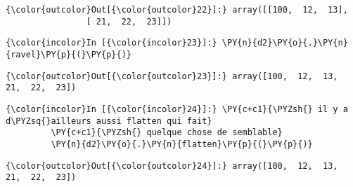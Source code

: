 \begin{Verbatim}[commandchars=\\\{\},frame=single,framerule=0.3mm,rulecolor=\color{cellframecolor}]
{\color{outcolor}Out[{\color{outcolor}22}]:} array([[100,  12,  13],
                [ 21,  22,  23]])
\end{Verbatim}
            
    \begin{Verbatim}[commandchars=\\\{\},frame=single,framerule=0.3mm,rulecolor=\color{cellframecolor}]
{\color{incolor}In [{\color{incolor}23}]:} \PY{n}{d2}\PY{o}{.}\PY{n}{ravel}\PY{p}{(}\PY{p}{)}
\end{Verbatim}


\begin{Verbatim}[commandchars=\\\{\},frame=single,framerule=0.3mm,rulecolor=\color{cellframecolor}]
{\color{outcolor}Out[{\color{outcolor}23}]:} array([100,  12,  13,  21,  22,  23])
\end{Verbatim}
            
    \begin{Verbatim}[commandchars=\\\{\},frame=single,framerule=0.3mm,rulecolor=\color{cellframecolor}]
{\color{incolor}In [{\color{incolor}24}]:} \PY{c+c1}{\PYZsh{} il y a d\PYZsq{}ailleurs aussi flatten qui fait}
         \PY{c+c1}{\PYZsh{} quelque chose de semblable}
         \PY{n}{d2}\PY{o}{.}\PY{n}{flatten}\PY{p}{(}\PY{p}{)}
\end{Verbatim}


\begin{Verbatim}[commandchars=\\\{\},frame=single,framerule=0.3mm,rulecolor=\color{cellframecolor}]
{\color{outcolor}Out[{\color{outcolor}24}]:} array([100,  12,  13,  21,  22,  23])
\end{Verbatim}
            

    
    
    

